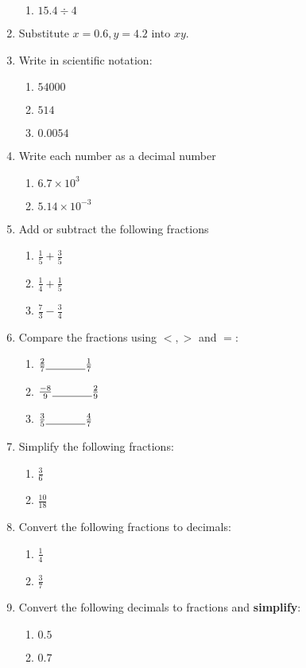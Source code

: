 \documentclass[12pt]{article}
\newcommand{\blk}{\underline{\hspace{0.5in}}}
\begin{document}
\begin{enumerate}
\begin{enumerate}
		\item $15.4 \div 4$
	\end{enumerate}
	\item Substitute $x=0.6, y=4.2$ into $xy$.
	\item Write in scientific notation:
	\begin{enumerate}
		\item $54000$
		\item $514$
		\item $0.0054$
	\end{enumerate}
	\item Write each number as a decimal number
	\begin{enumerate}
		\item $6.7 \times 10^3$
		\item $5.14 \times 10^{-3}$
	\end{enumerate}
	\item Add or subtract the following fractions
	\begin{enumerate}
		\item $\frac{1}{5} + \frac{3}{5}$
		\item $\frac{1}{4} + \frac{1}{5}$
		\item $\frac{7}{3} - \frac{3}{4}$
	\end{enumerate}
	\item Compare the fractions using $<, >$ and $=$:
	\begin{enumerate}
		\item $\frac{2}{7} \blk \frac{1}{7}$
		\item $\frac{-8}{9} \blk \frac{2}{9}$ 
		\item $\frac{3}{5} \blk \frac{4}{7}$
	\end{enumerate}
	\item Simplify the following fractions:
	\begin{enumerate}
		\item $\frac{3}{6}$
		\item $\frac{10}{18}$
	\end{enumerate}
	\item Convert the following fractions to decimals:
	\begin{enumerate}
		\item $\frac{1}{4}$
		\item $\frac{3}{7}$
	\end{enumerate}
	\item Convert the following decimals to fractions and \textbf{simplify}:
	\begin{enumerate}
		\item $0.5$
		\item $0.7$
	\end{enumerate}
\end{enumerate}
\end{document}
